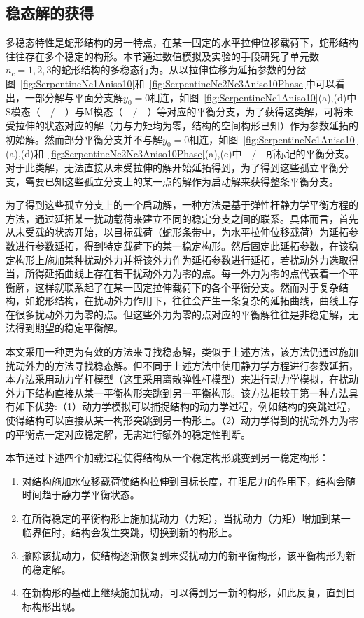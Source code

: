 \subsection{稳态解的获得}
多稳态特性是蛇形结构的另一特点，在某一固定的水平拉伸位移载荷下，蛇形结构往往存在多个稳定的构形。本节通过数值模拟及实验的手段研究了单元数$n_c=1,2,3$的蛇形结构的多稳态行为。从以拉伸位移为延拓参数的分岔图~\ref{fig:SerpentineNc1Aniso10}和~\ref{fig:SerpentineNc2Nc3Aniso10Phase}中可以看出，一部分解与平面分支解$y_0=0$相连，如图~\ref{fig:SerpentineNc1Aniso10}(a),(d)中S模态（~\bluesquare~/~\redsquare~）与M模态（~\Btriangle~/~\Rtriangle~）等对应的平衡分支，为了获得这类解，可将未受拉伸的状态对应的解（力与力矩均为零，结构的空间构形已知）作为参数延拓的初始解。然而部分平衡分支并不与解$y_0=0$相连，如图~\ref{fig:SerpentineNc1Aniso10}(a),(d)和~\ref{fig:SerpentineNc2Nc3Aniso10Phase}(a),(e)中~\Bdiamond~/~\Bstarshape~所标记的平衡分支。对于此类解，无法直接从未受拉伸的解开始延拓得到，为了得到这些孤立平衡分支，需要已知这些孤立分支上的某一点的解作为启动解来获得整条平衡分支。

为了得到这些孤立分支上的一个启动解，一种方法是基于弹性杆静力学平衡方程的方法，通过延拓某一扰动载荷来建立不同的稳定分支之间的联系\cite{Arena_2018,arena2017adaptive}。具体而言，首先从未受载的状态开始，以目标载荷（蛇形条带中，为水平拉伸位移载荷）为延拓参数进行参数延拓，得到特定载荷下的某一稳定构形。然后固定此延拓参数，在该稳定构形上施加某种扰动外力并将该外力作为延拓参数进行延拓，若扰动外力选取得当，所得延拓曲线上存在若干扰动外力为零的点。每一外力为零的点代表着一个平衡解，这样就联系起了在某一固定拉伸载荷下的各个平衡分支。然而对于复杂结构，如蛇形结构，在扰动外力作用下，往往会产生一条复杂的延拓曲线，曲线上存在很多扰动外力为零的点。但这些外力为零的点对应的平衡解往往是非稳定解，无法得到期望的稳定平衡解。

本文采用一种更为有效的方法来寻找稳态解，类似于上述方法，该方法仍通过施加扰动外力的方法寻找稳态解。但不同于上述方法中使用静力学方程进行参数延拓，本方法采用动力学杆模型（这里采用离散弹性杆模型）来进行动力学模拟，在扰动外力下结构直接从某一平衡构形突跳到另一平衡构形。该方法相较于第一种方法具有如下优势:（1）动力学模拟可以捕捉结构的动力学过程，例如结构的突跳过程，使得结构可以直接从某一构形突跳到另一构形上。（2）动力学得到的扰动外力为零的平衡点一定对应稳定解，无需进行额外的稳定性判断。

本节通过下述四个加载过程使得结构从一个稳定构形跳变到另一稳定构形：
\begin{enumerate}
	\item 对结构施加水位移载荷使结构拉伸到目标长度，在阻尼力的作用下，结构会随时间趋于静力学平衡状态。
	\item 在所得稳定的平衡构形上施加扰动力（力矩），当扰动力（力矩）增加到某一临界值时，结构会发生突跳，切换到新的构形上。
	\item 撤除该扰动力，使结构逐渐恢复到未受扰动力的新平衡构形，该平衡构形为新的稳定解。
	\item 在新构形的基础上继续施加扰动，可以得到另一新的构形，如此反复，直到目标构形出现。
\end{enumerate}

